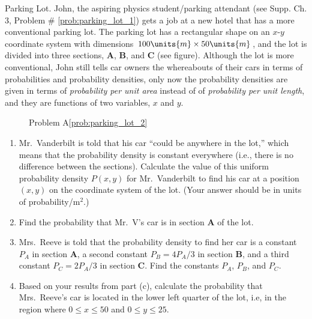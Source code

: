 \begin{aproblem}{ Parking Lot.}  
  John, the aspiring physics student/parking attendant (see
  Supp. Ch. 3, Problem \# \ref{prob:parking_lot_1}) gets a job at a
  new hotel that has a more conventional parking lot.  The parking lot
  has a rectangular shape on an $x$-$y$ coordinate system with
  dimensions $100\units{m}\times 50\units{m}$, and the lot is divided
  into three sections, {\bf A}, {\bf B}, and {\bf C} (see figure).
  Although the lot is more conventional, John still tells car owners
  the whereabouts of their cars in terms of probabilities and
  probability densities, only now the probability densities are given
  in terms of {\em probability per unit area} instead of of {\em
    probability per unit length}, and they are functions of two
  variables, $x$ and $y$.
  \label{prob:parking_lot_2}
  \begin{figure}[h]
    \begin{center}
      \caption{Problem A\ref{prob:parking_lot_2}}
    \end{center}
  \end{figure}

  \begin{enumerate}
  \item Mr.~Vanderbilt is told that his car ``could be anywhere in the
    lot,'' which means that the probability density is constant
    everywhere (i.e., there is no difference between the sections).
    Calculate the value of this uniform probability density $P(x,y)$
    for Mr.~Vanderbilt to find his car at a position $(x,y)$ on the
    coordinate system of the lot.  (Your answer should be in units of
    probability/m$^2$.)
  \item Find the probability that Mr.~V's car is in section {\bf A} of
    the lot.
  \item Mrs.~Reeve is told that the probability density to find her
    car is a constant $P_A$ in section {\bf A}, a second constant $P_B
    = 4P_A/3$ in section {\bf B}, and a third constant $P_C = 2P_A/3$
    in section {\bf C}.  Find the constants $P_A$, $P_B$, and $P_C$.
  \item Based on your results from part (c), calculate the probability
    that Mrs.~Reeve's car is located in the lower left quarter of the
    lot, i.e, in the region where $0\leq x\leq 50$ and $0\leq y \leq
    25$.
  \end{enumerate}
\end{aproblem}

